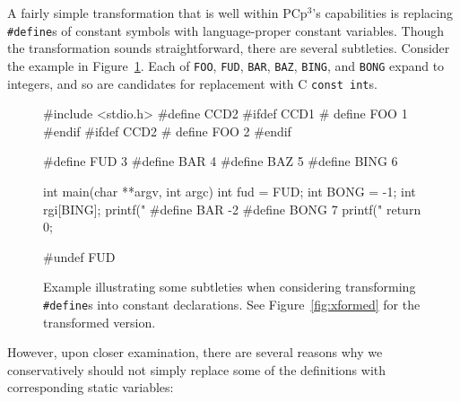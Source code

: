 \documentclass{article}
\newcommand{\pcp}{\mbox{\textsf{PCp}$^3$}}
\newcommand{\C}{\mbox{C}}
\newcommand{\ppd}[1]{\texttt{\##1}}
\newcommand{\figref}[1]{Figure~\ref{#1}}
\begin{document}
A fairly simple transformation that is well within \pcp{}'s capabilities
is replacing \ppd{define}s of constant symbols with language-proper
constant variables.  Though the transformation sounds straightforward,
there are several subtleties.  Consider the example in
\figref{fig:def_example}.  Each of \texttt{FOO}, \texttt{FUD},
\texttt{BAR}, \texttt{BAZ}, \texttt{BING}, and \texttt{BONG} expand to
integers, and so are candidates for replacement with \C{} \texttt{const
  int}s.

\begin{figure}[htbp]
\begin{center}
\begin{small}
\begin{pseudocode}[4.5in]
#include <stdio.h>
#define CCD2
#ifdef CCD1
#  define FOO 1
#endif
#ifdef CCD2
#  define FOO 2
#endif

#define FUD 3
#define BAR 4
#define BAZ 5
#define BING 6

int
main(char **argv, int argc) {
  int fud = FUD;
  int BONG = -1;
  int rgi[BING];
  printf("%
#define BAR -2
#define BONG 7
  printf("%
  return 0;
}

#undef FUD
\end{pseudocode}
\end{small}
\caption{Example illustrating some subtleties when considering transforming \ppd{define}s
  into constant declarations.  See \figref{fig:xformed} for the transformed version.}
\label{fig:def_example}
\end{center}
\end{figure}

However, upon closer examination, there are several reasons why we
conservatively should not simply replace some of the definitions with
corresponding static variables:
\end{document}

